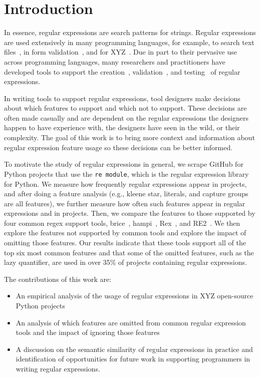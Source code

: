 \section{Introduction}

 In essence, regular expressions are search patterns for strings. Regular expressions are used extensively in many programming languages, for example, to search text files~\cite{Clarke:1997:URE:256167.256174}, in form validation~\cite{}, and for XYZ~\cite{}. Due in part to their pervasive use across programming languages, many researchers and practitioners have developed tools to support the creation~\cite{}, validation~\cite{}, and testing~\cite{} of regular expressions. 
 
 In writing tools to support regular expressions, tool designers make decisions about which features to support and which not to support. These decisions are often made casually and are dependent on the regular expressions the designers happen to have experience with, the designers have seen in the wild, or their complexity. The goal of this work is to bring more context and information about regular expression feature usage so these decisions can be better informed. 
 
To motivate the study of regular expressions in general, we scrape GitHub for Python projects that use the {\tt re module}, which is the regular expression library for Python. We measure how frequently regular expressions appear in projects, and after doing a feature analysis (e.g., kleene star, literals, and capture groups are all features), we further measure how often such features appear in regular expressions and in projects. Then, we compare the features to those supported by four common regex support tools, brice~\cite{}, hampi~\cite{}, Rex~\cite{}, and RE2~\cite{}. We then explore the features not supported by common tools and explore the impact of omitting those features. Our results indicate that these tools support all of the top six most common features and that some of the omitted features, such as the lazy quantifier, are used in over 35\% of projects containing regular expressions. 

The contributions of this work are:

\begin{itemize}
	\item An empirical analysis of the usage of regular expressions in XYZ open-source Python projects
	\item An analysis of which features are omitted from common regular expression tools and the impact of ignoring those features
	\item A discussion on the semantic similarity of regular expressions in practice and identification of opportunities for future work in supporting programmers in writing regular expressions. 
\end{itemize}

